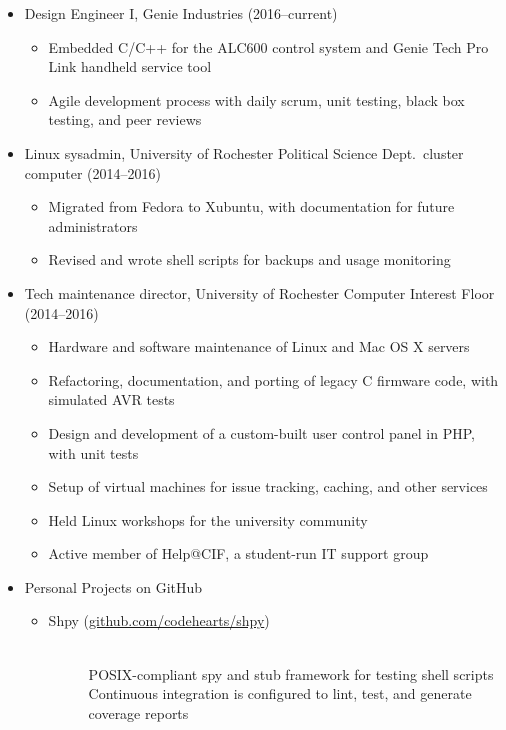 \documentclass[10pt]{article}
\begin{document}
\begin{itemize}
	\item Design Engineer I, Genie Industries (2016--current)
		\begin{itemize}
      \item Embedded C/C++ for the ALC600 control system and Genie Tech Pro Link handheld service tool
			\item Agile development process with daily scrum, unit testing, black box testing, and peer reviews
		\end{itemize}
	\item Linux sysadmin, University of Rochester Political Science Dept.\ cluster computer (2014--2016)
		\begin{itemize}
			\item Migrated from Fedora to Xubuntu, with documentation for future administrators
			\item Revised and wrote shell scripts for backups and usage monitoring
		\end{itemize}
	\item Tech maintenance director, University of Rochester Computer Interest Floor (2014--2016)
		\begin{itemize}
			\item Hardware and software maintenance of Linux and Mac OS X servers
			\item Refactoring, documentation, and porting of legacy C firmware code, with simulated AVR tests
			\item Design and development of a custom-built user control panel in PHP, with unit tests
			\item Setup of virtual machines for issue tracking, caching, and other services
			\item Held Linux workshops for the university community
			\item Active member of Help@CIF, a student-run IT support group
		\end{itemize}
	\item Personal Projects on GitHub
		\begin{itemize}
			\item \begin{description}
				\item[Shpy (\href{https://github.com/codehearts/shpy}{github.com/codehearts/shpy})] \hfill \\
					POSIX-compliant spy and stub framework for testing shell scripts \\
					Continuous integration is configured to lint, test, and generate coverage reports

\end{description}
\end{itemize}
\end{itemize}
\end{document}

